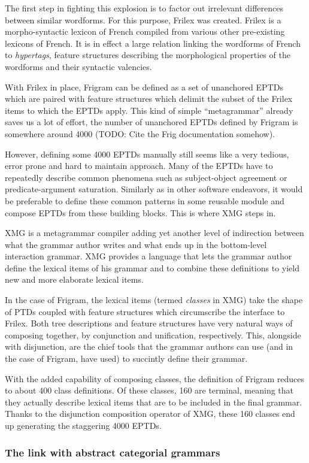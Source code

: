 The first step in fighting this explosion is to factor out irrelevant
differences between similar wordforms. For this purpose, Frilex was
created. Frilex is a morpho-syntactic lexicon of French compiled from
various other pre-existing lexicons of French. It is in effect a large
relation linking the wordforms of French to \emph{hypertags}, feature
structures describing the morphological properties of the wordforms and
their syntactic valencies.

With Frilex in place, Frigram can be defined as a set of unanchored
EPTDs which are paired with feature structures which delimit the subset
of the Frilex items to which the EPTDs apply. This kind of simple
``metagrammar'' already saves us a lot of effort, the number of
unanchored EPTDs defined by Frigram is somewhere around 4000 (TODO: Cite
the Frig documentation somehow).

However, defining some 4000 EPTDs manually still seems like a very
tedious, error prone and hard to maintain approach. Many of the EPTDs
have to repeatedly describe common phenomena such as subject-object
agreement or predicate-argument saturation. Similarly as in other
software endeavors, it would be preferable to define these common
patterns in some reusable module and compose EPTDs from these building
blocks. This is where XMG steps in.

XMG is a metagrammar compiler adding yet another level of indirection
between what the grammar author writes and what ends up in the
bottom-level interaction grammar. XMG provides a language that lets the
grammar author define the lexical items of his grammar and to combine
these definitions to yield new and more elaborate lexical items.

In the case of Frigram, the lexical items (termed \emph{classes} in XMG)
take the shape of PTDs coupled with feature structures which
circumscribe the interface to Frilex. Both tree descriptions and feature
structures have very natural ways of composing together, by conjunction
and unification, respectively. This, alongside with disjunction, are the
chief tools that the grammar authors can use (and in the case of
Frigram, have used) to succintly define their grammar.

With the added capability of composing classes, the definition of
Frigram reduces to about 400 class definitions. Of these classes, 160
are terminal, meaning that they actually describe lexical items that are
to be included in the final grammar. Thanks to the disjunction
composition operator of XMG, these 160 classes end up generating the
staggering 4000 EPTDs.

\subsubsection{The link with abstract categorial grammars}
\label{sssec:link-ig-acg}
